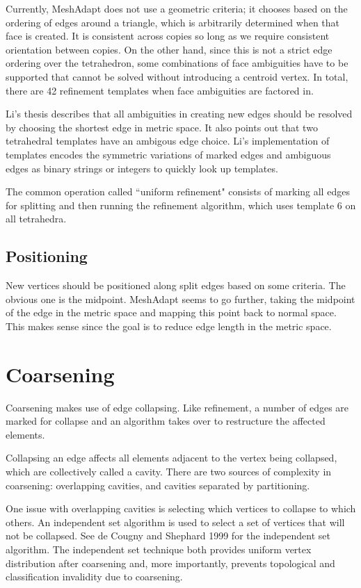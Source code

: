 \documentclass{article}
\begin{document}
Currently, MeshAdapt does not use a geometric criteria; it chooses
based on the ordering of edges around a triangle, which is arbitrarily
determined when that face is created.
It is consistent across copies so long as we require consistent
orientation between copies.
On the other hand, since this is not a strict edge ordering over the
tetrahedron, some combinations of face ambiguities have to be supported
that cannot be solved without introducing a centroid vertex.
In total, there are 42 refinement templates when face ambiguities
are factored in.

Li's thesis describes that all ambiguities in creating new edges
should be resolved by choosing the shortest edge in metric space.
It also points out that two tetrahedral templates have an ambigous
edge choice.
Li's implementation of templates encodes the symmetric variations
of marked edges and ambiguous edges as binary strings or
integers to quickly look up templates.

The common operation called ``uniform refinement" consists of marking
all edges for splitting and then running the refinement algorithm,
which uses template $6$ on all tetrahedra.

\subsection{Positioning}

New vertices should be positioned along split edges based on some
criteria.
The obvious one is the midpoint.
MeshAdapt seems to go further, taking the midpoint of the edge
in the metric space and mapping this point back to normal space.
This makes sense since the goal is to reduce edge length
in the metric space.

\section{Coarsening}

Coarsening makes use of edge collapsing.
Like refinement, a number of edges are marked for
collapse and an algorithm takes over to restructure
the affected elements.

Collapsing an edge affects all elements adjacent to the
vertex being collapsed,
which are collectively called a cavity.
There are two sources of complexity in coarsening:
overlapping cavities, and cavities separated by partitioning.

One issue with overlapping cavities is selecting which vertices
to collapse to which others.
An independent set algorithm is used to select a set of vertices
that will not be collapsed.
See de Cougny and Shephard 1999 for the independent set algorithm.
The independent set technique both provides uniform vertex distribution
after coarsening and, more importantly, prevents topological
and classification
invalidity due to coarsening.
\end{document}
